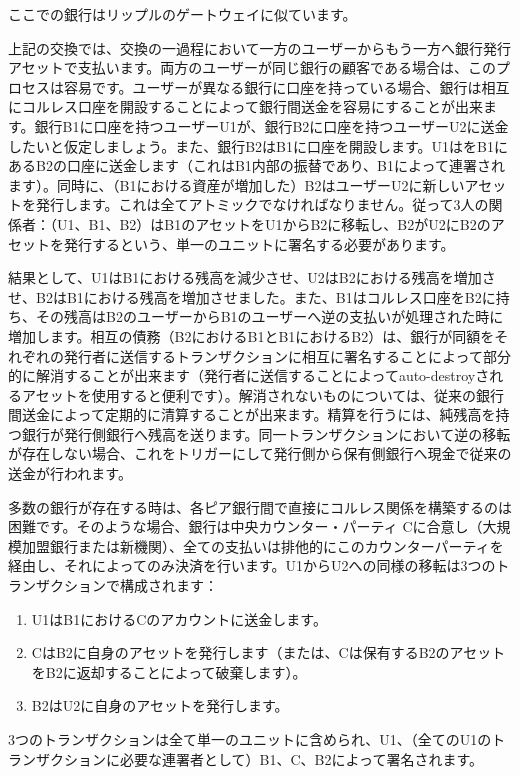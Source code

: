 \documentclass[a4paper, dvipdfmx]{jsarticle}
\begin{document}
\noindent ここでの銀行はリップルのゲートウェイに似ています。

上記の交換では、交換の一過程において一方のユーザーからもう一方へ銀行発行アセットで支払います。両方のユーザーが同じ銀行の顧客である場合は、このプロセスは容易です。ユーザーが異なる銀行に口座を持っている場合、銀行は相互にコルレス口座を開設することによって銀行間送金を容易にすることが出来ます。銀行B1に口座を持つユーザーU1が、銀行B2に口座を持つユーザーU2に送金したいと仮定しましょう。また、銀行B2はB1に口座を開設します。U1はをB1にあるB2の口座に送金します（これはB1内部の振替であり、B1によって連署されます）。同時に、（B1における資産が増加した）B2はユーザーU2に新しいアセットを発行します。これは全てアトミックでなければなりません。従って3人の関係者：（U1、B1、B2）はB1のアセットをU1からB2に移転し、B2がU2にB2のアセットを発行するという、単一のユニットに署名する必要があります。

結果として、U1はB1における残高を減少させ、U2はB2における残高を増加させ、B2はB1における残高を増加させました。また、B1はコルレス口座をB2に持ち、その残高はB2のユーザーからB1のユーザーへ逆の支払いが処理された時に増加します。相互の債務（B2におけるB1とB1におけるB2）は、銀行が同額をそれぞれの発行者に送信するトランザクションに相互に署名することによって部分的に解消することが出来ます（発行者に送信することによってauto-destroyされるアセットを使用すると便利です）。解消されないものについては、従来の銀行間送金によって定期的に清算することが出来ます。精算を行うには、純残高を持つ銀行が発行側銀行へ残高を送ります。同一トランザクションにおいて逆の移転が存在しない場合、これをトリガーにして発行側から保有側銀行へ現金で従来の送金が行われます。

多数の銀行が存在する時は、各ピア銀行間で直接にコルレス関係を構築するのは困難です。そのような場合、銀行は中央カウンター・パーティ Cに合意し（大規模加盟銀行または新機関）、全ての支払いは排他的にこのカウンターパーティを経由し、それによってのみ決済を行います。U1からU2への同様の移転は3つのトランザクションで構成されます：

\begin{enumerate}
    \item U1はB1におけるCのアカウントに送金します。
    \item CはB2に自身のアセットを発行します（または、Cは保有するB2のアセットをB2に返却することによって破棄します）。
    \item B2はU2に自身のアセットを発行します。
\end{enumerate}

\noindent 3つのトランザクションは全て単一のユニットに含められ、U1、（全てのU1のトランザクションに必要な連署者として）B1、C、B2によって署名されます。
\end{document}

